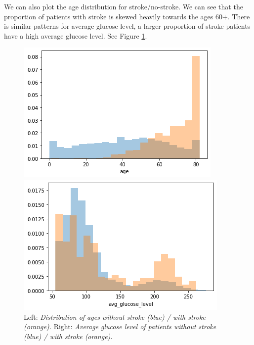 \documentclass[10pt]{article}
\begin{document}
We can also plot the age distribution for stroke/no-stroke. We can see that the proportion of patients with stroke is skewed heavily towards the ages 60+. There is similar patterns for average glucose level, a larger proportion of stroke patients have a high average glucose level. See Figure \ref{fig2}.
\begin{figure}[h!]
\centering  
\begin{minipage}[b]{0.45\textwidth}
    \includegraphics[width=\textwidth]{index3.png}
  \end{minipage}
  \hfill
  \begin{minipage}[b]{0.45\textwidth}
    \includegraphics[width=\textwidth]{index1.png}
  \end{minipage}
\caption{Left: \textit{Distribution of ages without stroke (blue) / with stroke (orange).} Right: \textit{Average glucose level of patients without stroke (blue) / with stroke (orange).}}
\label{fig2}
\end{figure}
\end{document}
